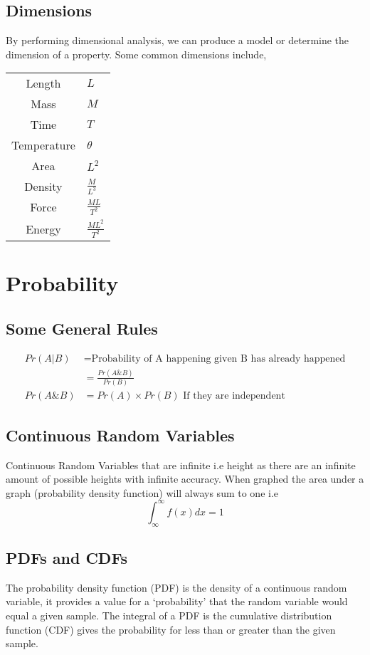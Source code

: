 \documentclass[12pt] {article}
\begin{document}
\subsection*{Dimensions}
By performing dimensional analysis, we can produce a model or determine the dimension of a property. Some common dimensions include,

\begin{center}
\begin{tabular}{c|l}
  Length & $L$ \\
  Mass & $M$ \\
  Time & $T$ \\
  Temperature & $\theta$ \\
  Area & $L^2$ \\
  Density & $\frac{M}{L^3}$ \\
  Force & $\frac{ML}{T^2}$ \\
  Energy & $\frac{ML^2}{T^2}$ \\
\end{tabular}
\end{center}

\section{Probability}
\subsection*{Some General Rules}
\begin{align*}
  Pr(A \vert B) &= \text{Probability of A happening given B has already happened} \\
                &= \frac{Pr(A\&B)}{Pr(B)} \\
  Pr(A \& B) &= Pr(A) \times Pr(B) \text{ If they are independent}
\end{align*}
\subsection*{Continuous Random Variables}
Continuous Random Variables that are infinite i.e height as there are an infinite amount 
of possible heights with infinite accuracy. When graphed the area under a graph (probability density function)
will always sum to one i.e
\begin{equation*}
  \int_\infty^\infty f(x)dx = 1 
\end{equation*}

\subsection*{PDFs and CDFs}
The probability density function (PDF) is the density of a continuous random variable, it provides
a value for a `probability' that the random variable would equal a given sample. The integral
of a PDF is the cumulative distribution function (CDF) gives the probability for less than or greater than
the given sample.
\end{document}
